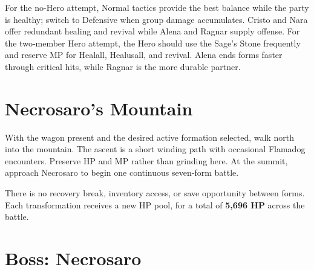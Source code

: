 \documentclass[
  american,
  10pt,
  letterpaper,
  oneside,
  open=any]{scrreprt}
\begin{document}
For the no-Hero attempt, Normal tactics provide the best balance while
the party is healthy; switch to Defensive when group damage accumulates.
Cristo and Nara offer redundant healing and revival while Alena and
Ragnar supply offense. For the two-member Hero attempt, the Hero should
use the Sage's Stone frequently and reserve MP for Healall, Healusall,
and revival. Alena ends forms faster through critical hits, while Ragnar
is the more durable partner.

\section{Necrosaro's Mountain}\label{necrosaros-mountain}

With the wagon present and the desired active formation selected, walk
north into the mountain. The ascent is a short winding path with
occasional Flamadog encounters. Preserve HP and MP rather than grinding
here. At the summit, approach Necrosaro to begin one continuous
seven-form battle.

There is no recovery break, inventory access, or save opportunity
between forms. Each transformation receives a new HP pool, for a total
of \textbf{5,696 HP} across the battle.

\section{Boss: Necrosaro}\label{boss-necrosaro}
\end{document}
